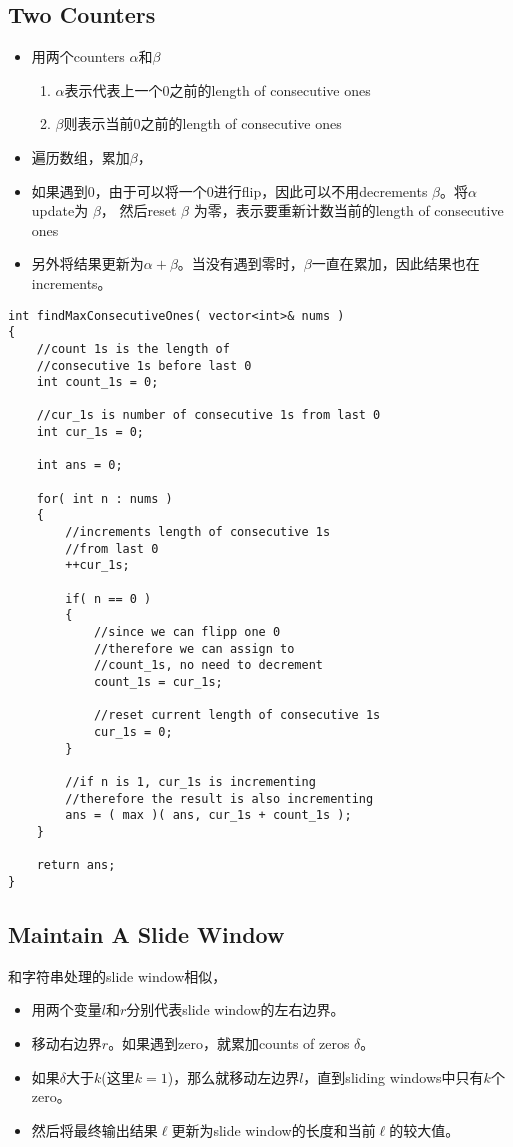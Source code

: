 \subsection{Two Counters}
\begin{itemize}
\item 用两个counters $\alpha$和$\beta$
\begin{enumerate}
\item $\alpha$表示代表上一个0之前的length of consecutive ones
\item $\beta$则表示当前0之前的length of consecutive ones
\end{enumerate}
\item 遍历数组，累加$\beta$，
\item 如果遇到0，由于可以将一个0进行flip，因此可以不用decrements $\beta$。将$\alpha$ update为  $\beta$， 然后reset $\beta$ 为零，表示要重新计数当前的length of consecutive ones
\item 另外将结果更新为$\alpha+\beta$。当没有遇到零时，$\beta$一直在累加，因此结果也在increments。
\end{itemize}

\setcounter{lstlisting}{0}
\begin{lstlisting}[style=customc, caption={Two Counters}]
int findMaxConsecutiveOnes( vector<int>& nums )
{
    //count 1s is the length of
    //consecutive 1s before last 0
    int count_1s = 0;

    //cur_1s is number of consecutive 1s from last 0
    int cur_1s = 0;

    int ans = 0;

    for( int n : nums )
    {
        //increments length of consecutive 1s
        //from last 0
        ++cur_1s;

        if( n == 0 )
        {
            //since we can flipp one 0
            //therefore we can assign to
            //count_1s, no need to decrement
            count_1s = cur_1s;

            //reset current length of consecutive 1s
            cur_1s = 0;
        }

        //if n is 1, cur_1s is incrementing
        //therefore the result is also incrementing
        ans = ( max )( ans, cur_1s + count_1s );
    }

    return ans;
}
\end{lstlisting}

\subsection{Maintain A Slide Window}
和字符串处理的slide window相似，
\begin{itemize}
\item 用两个变量$l$和$r$分别代表slide window的左右边界。
\item 移动右边界$r$。如果遇到zero，就累加counts of zeros $\delta$。
\item 如果$\delta$大于$k$(这里$k=1$)，那么就移动左边界$l$，直到sliding windows中只有$k$个zero。
\item 然后将最终输出结果$\ell$更新为slide window的长度和当前$\ell$的较大值。
\end{itemize}


